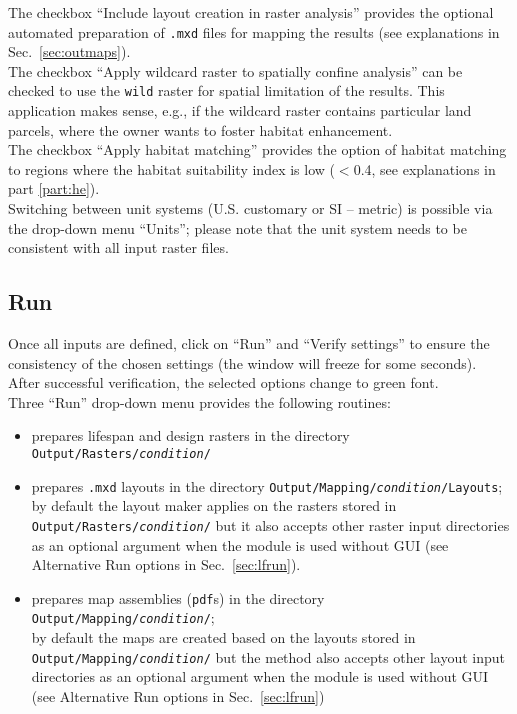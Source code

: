 The checkbox ``Include layout creation in raster analysis'' provides the optional automated preparation of \texttt{.mxd} files for mapping the results (see explanations in Sec.~\ref{sec:outmaps}).\\
The checkbox ``Apply wildcard raster to spatially confine analysis'' can be checked to use the \texttt{wild} raster for spatial limitation of the results. This application makes sense, e.g., if the wildcard raster contains particular land parcels, where the owner wants to foster habitat enhancement.\\
The checkbox ``Apply habitat matching'' provides the option of habitat matching to regions where the habitat suitability index is low ($<$0.4, see explanations in part \ref{part:he}).\\
Switching between unit systems (U.S. customary or SI -- metric) is possible via the drop-down menu ``Units''; please note that the unit system needs to be consistent with all input raster files.

\subsection{Run}

Once all inputs are defined, click on ``Run'' and ``Verify settings'' to ensure the consistency of the chosen settings (the window will freeze for some seconds). After successful verification, the selected options change to green font.\\

Three ``Run'' drop-down menu provides the following routines:
\begin{itemize}
\item {} prepares lifespan and design rasters in the directory \texttt{Output/Rasters/\textit{condition}/}
\item {} prepares \texttt{.mxd} layouts in the directory \texttt{Output/Mapping/\textit{condition}/Layouts};\\
by default the layout maker applies on the rasters stored in \texttt{Output/Rasters/\textit{condition}/} but it also accepts other raster input directories as an optional argument when the module is used without GUI (see Alternative Run options in Sec.~\ref{sec:lfrun}).
\item {} prepares map assemblies (\texttt{pdf}s) in the directory \texttt{Output/Mapping/\textit{condition}/};\\
by default the maps are created based on the layouts stored in \texttt{Output/Mapping/\textit{condition}/} but the method also accepts other layout input directories as an optional argument when the module is used without GUI (see Alternative Run options in Sec.~\ref{sec:lfrun})
\end{itemize}

